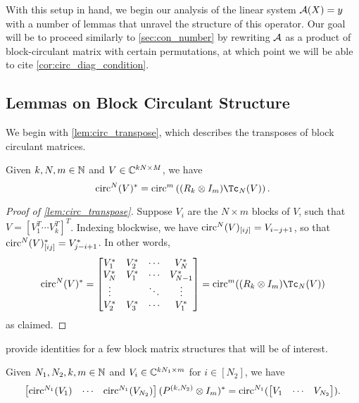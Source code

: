 With this setup in hand, we begin our analysis of the linear system $\mathcal{A}(X) = y$ with a number of lemmas that unravel the structure of this operator.  Our goal will be to proceed similarly to \cref{sec:con_number} by rewriting $\mathcal{A}$ as a product of block-circulant matrix with certain permutations, at which point we will be able to cite \cref{cor:circ_diag_condition}.

\subsection{Lemmas on Block Circulant Structure}
\label{sec:ptych_lem}
We begin with \cref{lem:circ_transpose}, which describes the transposes of block circulant matrices.
\begin{lemma}
\label{lem:circ_transpose} Given $k, N, m \in \mathbb{N}$ and $V \in \mathbb{C}^{kN \times M}$, we have \[\circop^N(V)^* = \circop^m\left( (R_k \otimes I_m) \Tc_N(V) \right).\] 
\end{lemma}
\begin{proof}[Proof of \cref{lem:circ_transpose}]
  Suppose $V_i$ are the $N \times m$ blocks of $V$, such that $V = \left[V_1^T \cdots V_k^T\right]^T$.  Indexing blockwise, we have $\operatorname{circ}^N(V)_{[ij]} = V_{i - j + 1}$, so that $\operatorname{circ}^N(V)^*_{[ij]} = V_{j - i + 1}^*$.  In other words,
  \[
  \circop^N(V)^* = \begin{bmatrix} V_1^* & V_2^* & \cdots & V_N^* \\ V_N^* & V_1^* & \cdots & V_{N - 1}^* \\ \vdots & & \ddots & \vdots \\ V_2^* & V_3^* & \cdots & V_1^* \end{bmatrix} = \circop^m((R_k \otimes I_m) \Tc_N(V) )
  \]
  as claimed.  
\end{proof}

 provide identities for a few block matrix structures that will be of interest.
\begin{lemma}\label{lem:block_circ_right}
  Given $N_1, N_2, k, m \in \mathbb{N}$ and $V_i \in \mathbb{C}^{k N_1 \times m}$ for $i \in [N_2]$, we have \[\begin{bmatrix} \operatorname{circ}^{N_1}(V_1) & \cdots & \operatorname{circ}^{N_1}(V_{N_2}) \end{bmatrix} (P^{(k, N_2)} \otimes I_m)^* = \operatorname{circ}^{N_1}(\begin{bmatrix} V_1 & \cdots & V_{N_2}\end{bmatrix}).\]
\end{lemma}

